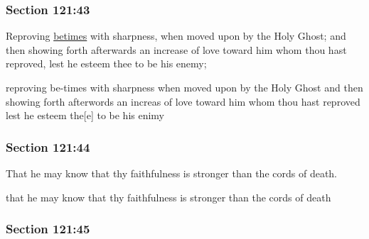 	\subsubsection{Section 121:43} %
		\label{DC121-43}
		
		Reproving \hyperref[BETIMES]{betimes} with sharpness, when moved upon by the Holy Ghost; and then showing forth afterwards an increase of love toward him whom thou hast reproved, lest he esteem thee to be his enemy;
		
		\begin{framed}
		\scriptsize
			\begin{compactdesc}
				\item[JSP] reproving be-times with sharpness when moved upon by the Holy Ghost and then showing forth afterwords an increas of love toward him whom thou hast reproved lest he esteem the[e] to be his enimy
			\end{compactdesc}
		\end{framed}
		
	\subsubsection{Section 121:44} %
		\label{DC121-44}
		
		That he may know that thy faithfulness is stronger than the cords of death.
		
		\begin{framed}
		\scriptsize
			\begin{compactdesc}
				\item[JSP] that he may know that thy faithfulness is stronger than the cords of death
			\end{compactdesc}
		\end{framed}
		
	\subsubsection{Section 121:45} %
		\label{DC121-45}
		
